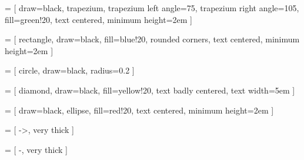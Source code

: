 \usetikzlibrary{shapes}
\usetikzlibrary{arrows}
\usetikzlibrary{intersections}
\usepackage{tkz-euclide}

 = [
  draw=black,
  trapezium,
  trapezium left angle=75,
  trapezium right angle=105,
  fill=green!20,
  text centered,
  minimum height=2em
]

 = [
  rectangle,
  draw=black,
  fill=blue!20,
  rounded corners,
  text centered,
  minimum height=2em
]

 = [
  circle,
  draw=black,
  radius=0.2
]

 = [
  diamond,
  draw=black,
  fill=yellow!20,
  text badly centered,
  text width=5em
]

 = [
  draw=black,
  ellipse,
  fill=red!20,
  text centered,
  minimum height=2em
]

 = [
  ->, 
  very thick
]

 = [
  -,
  very thick
]

